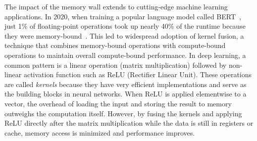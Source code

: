 The impact of the memory wall extends to cutting-edge machine learning applications. In 2020, when training a popular language model called BERT~\cite{Devlin_2018_BERT_Pre_train}, just 1\% of floating-point operations took up nearly 40\% of the runtime because they were memory-bound~\cite{Ivanov_2020_Data_Movement_I}. This led to widespread adoption of kernel fusion, a technique that combines memory-bound operations with compute-bound operations to maintain overall compute-bound performance. In deep learning, a common pattern is a linear operation (matrix multiplication) followed by non-linear activation function such as ReLU (Rectifier Linear Unit). These operations are called \emph{kernels} because they have very efficient implementations and serve as the building blocks in neural networks. When ReLU is applied elementwise to a vector, the overhead of loading the input and storing the result to memory outweighs the computation itself. However, by fusing the kernels and applying ReLU directly after the matrix multiplication while the data is still in registers or cache, memory access is minimized and performance improves.

